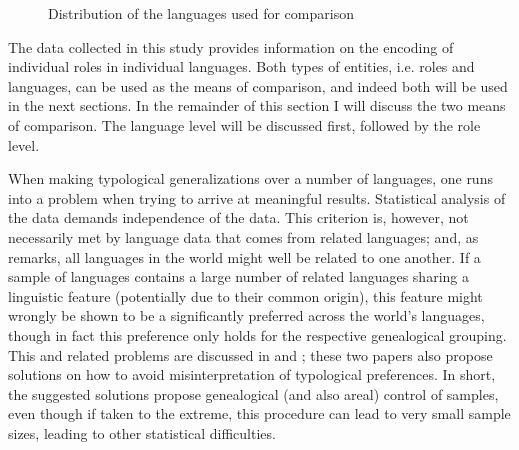 \begin{figure}[htbp] \centering {}
\caption{Distribution of the languages used for comparison}\label{MapReduxBW}
\end{figure}


The data collected in this study provides information on the encoding of individual roles in individual languages. 
Both types of entities, i.e. roles and languages, can be used as the means of comparison, and indeed both will be used in the next sections.
In the remainder of this section I will discuss the two means of comparison. 
The language level will be discussed first, followed by the role level. 

When making typological generalizations over a number of languages, one runs into a problem when trying to arrive at meaningful results.
Statistical analysis of the data demands independence of the data. 
This criterion is, however, not necessarily met by language data that comes from related languages; and, as \citet{Dryer:1989} remarks, all languages in the world might well be related to one another.
If a sample of languages contains a large number of related languages sharing a linguistic feature (potentially due to their common origin), this feature might wrongly be shown to be a significantly preferred across the world's languages, though in fact this preference only holds for the respective genealogical grouping. 
This and related problems are discussed in \citet{Dryer:1989} and \citet{Bickel.samp}; these two papers also propose solutions on how to avoid misinterpretation of typological preferences.
In short, the suggested solutions propose genealogical (and also areal) control of samples, even though if taken to the extreme, this procedure can lead to very small sample sizes, leading to other statistical difficulties. 

